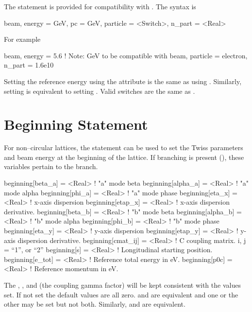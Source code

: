 The  statement is provided for compatibility with \mad. The syntax is
\begin{example}
  beam, energy = GeV, pc = GeV, particle = <Switch>, n_part = <Real>
\end{example}
For example
\begin{example}
  beam, energy = 5.6  ! Note: GeV to be compatible with \mad
  beam, particle = electron, n_part = 1.6e10
\end{example}
Setting the reference energy using the  attribute is the
same as using . Similarly, setting  is
equivalent to setting . Valid  switches
are the same as .

\section{Beginning Statement}
\label{s:beginning}

For non--circular lattices, the  statement can be used to
set the Twiss parameters and beam energy at the beginning of the lattice.
If branching is present (), these variables
pertain to the  branch. \begin{example}
  beginning[beta_a]  = <Real>  ! "a" mode beta
  beginning[alpha_a] = <Real>  ! "a" mode alpha
  beginning[phi_a]   = <Real>  ! "a" mode phase
  beginning[eta_x]   = <Real>  ! x-axis dispersion
  beginning[etap_x]  = <Real>  ! x-axis dispersion derivative.
  beginning[beta_b]  = <Real>  ! "b" mode beta
  beginning[alpha_b] = <Real>  ! "b" mode alpha
  beginning[phi_b]   = <Real>  ! "b" mode phase
  beginning[eta_y]   = <Real>  ! y-axis dispersion
  beginning[etap_y]  = <Real>  ! y-axis dispersion derivative.
  beginning[cmat_ij] = <Real>  ! C coupling matrix. i, j = {``1'', or ``2''} 
  beginning[s]       = <Real>  ! Longitudinal starting position.
  beginning[e_tot]   = <Real>  ! Reference total energy in eV.
  beginning[p0c]     = <Real>  ! Reference momentum in eV.
\end{example}
The , , and  (the coupling gamma
factor) will be kept consistent with the values set. If not set the
default values are all zero.   and
 are equivalent and one or the other may be
set but not both. Similarly,  and
 are equivalent.

